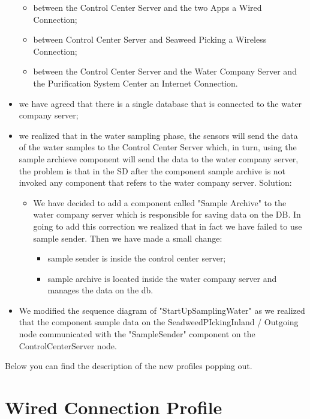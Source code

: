 \begin{itemize}
	\begin{itemize}
		\item between the Control Center Server and the two Apps a 				Wired Connection;
		\item between Control Center Server and Seaweed Picking a 				Wireless Connection;
		\item between the Control Center Server and the Water Company 			Server and the Purification System Center an Internet 					Connection.
	\end{itemize}

	\item we have agreed that there is a single database that is 			connected to the water company server;
	\item we realized that in the water sampling phase, the sensors 		will send the data of the water samples to the Control Center 			Server which, in turn, using the sample archieve component will 		send the data to the water company server, the problem is that in 		the SD 	after the component sample archive is not invoked any 			component that refers to the water company server. Solution:
	\begin{itemize}
	\item We have decided to add a component called "Sample Archive" 		to the water company server which is responsible for saving data 		on the DB. In going to add this correction we realized 	that in			fact we have failed to use sample sender. Then we have made a 			small change: 
	\begin{itemize}
		\item sample sender is inside 	the control center server;
		\item sample archive is located inside the water company 				server and	manages the data on the db.
		\end{itemize}
	\end{itemize}	
	\item We modified the sequence diagram of "StartUpSamplingWater" 		as 	we realized that the component sample data on the 					SeadweedPIckingInland / Outgoing node communicated with the 			"SampleSender" component on the ControlCenterServer node.
\end{itemize}

Below you can find the description of the new profiles popping out.

\section{Wired Connection Profile}

